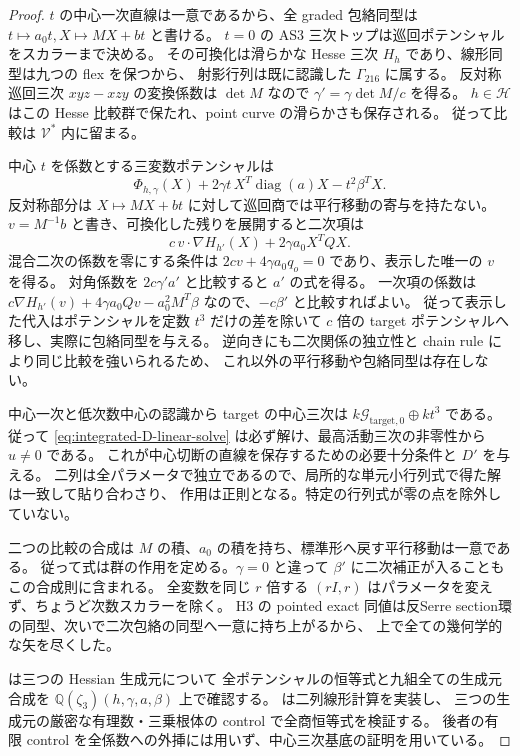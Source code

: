 \begin{proof}
$t$ の中心一次直線は一意であるから、全 graded 包絡同型は
$t\mapsto a_0t,X\mapsto MX+bt$ と書ける。
$t=0$ の AS3 三次トップは巡回ポテンシャルをスカラーまで決める。
その可換化は滑らかな Hesse 三次 $H_h$ であり、線形同型は九つの flex を保つから、
射影行列は既に認識した $\Gamma_{216}$ に属する。
反対称巡回三次 $xyz-xzy$ の変換係数は $\det M$ なので
$\gamma'=\gamma\det M/c$ を得る。
$h\in\mathcal H$ はこの Hesse 比較群で保たれ、point curve の滑らかさも保存される。
従って比較は $\mathcal V^*$ 内に留まる。

中心 $t$ を係数とする三変数ポテンシャルは
\[
 \Phi_{h,\gamma}(X)+2\gamma t\,X^T\operatorname{diag}(a)X-t^2\beta^TX.
\]
反対称部分は $X\mapsto MX+bt$ に対して巡回商では平行移動の寄与を持たない。
$v=M^{-1}b$ と書き、可換化した残りを展開すると二次項は
\[
 c\,v\cdot\nabla H_{h'}(X)+2\gamma a_0 X^TQX.
\]
混合二次の係数を零にする条件は
$2c v+4\gamma a_0q_o=0$ であり、表示した唯一の $v$ を得る。
対角係数を $2c\gamma'a'$ と比較すると $a'$ の式を得る。
一次項の係数は
$c\nabla H_{h'}(v)+4\gamma a_0Qv-a_0^2M^T\beta$ なので、$-c\beta'$ と比較すればよい。
従って表示した代入はポテンシャルを定数 $t^3$ だけの差を除いて
$c$ 倍の target ポテンシャルへ移し、実際に包絡同型を与える。
逆向きにも二次関係の独立性と chain rule により同じ比較を強いられるため、
これ以外の平行移動や包絡同型は存在しない。

中心一次と低次数中心の認識から target の中心三次は
$k\mathcal G_{\mathrm{target},0}\oplus kt^3$ である。
従って \eqref{eq:integrated-D-linear-solve} は必ず解け、最高活動三次の非零性から $u\ne0$ である。
これが中心切断の直線を保存するための必要十分条件と $D'$ を与える。
二列は全パラメータで独立であるので、局所的な単元小行列式で得た解は一致して貼り合わさり、
作用は正則となる。特定の行列式が零の点を除外していない。

二つの比較の合成は $M$ の積、$a_0$ の積を持ち、標準形へ戻す平行移動は一意である。
従って式は群の作用を定める。$\gamma=0$ と違って
$\beta'$ に二次補正が入ることもこの合成則に含まれる。
全変数を同じ $r$ 倍する $(rI,r)$ はパラメータを変えず、ちょうど次数スカラーを除く。
H3 の pointed exact 同値は反Serre section環の同型、次いで二次包絡の同型へ一意に持ち上がるから、
上で全ての幾何学的な矢を尽くした。

 は三つの Hessian 生成元について
全ポテンシャルの恒等式と九組全ての生成元合成を
$\mathbb Q(\zeta_3)(h,\gamma,a,\beta)$ 上で確認する。
 は二列線形計算を実装し、
三つの生成元の厳密な有理数・三乗根体の control で全商恒等式を検証する。
後者の有限 control を全係数への外挿には用いず、中心三次基底の証明を用いている。
\end{proof}

